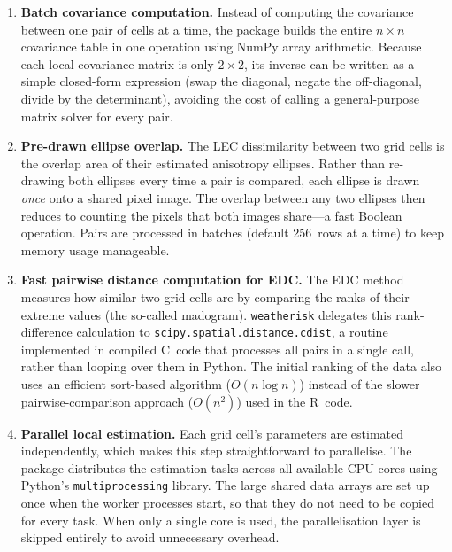 \documentclass[preprint,12pt,a4paper]{elsarticle}
\begin{document}
\begin{enumerate}
\item \textbf{Batch covariance computation.}
  Instead of computing the covariance between one pair of cells at
  a time, the package builds the entire $n \times n$ covariance
  table in one operation using NumPy array arithmetic.  Because each
  local covariance matrix is only $2\times 2$, its inverse can be
  written as a simple closed-form expression (swap the diagonal,
  negate the off-diagonal, divide by the determinant), avoiding the
  cost of calling a general-purpose matrix solver for every pair.

\item \textbf{Pre-drawn ellipse overlap.}
  The LEC dissimilarity between two grid cells is the overlap area
  of their estimated anisotropy ellipses.  Rather than re-drawing
  both ellipses every time a pair is compared, each ellipse is
  drawn \emph{once} onto a shared pixel image.  The overlap between
  any two ellipses then reduces to counting the pixels that both
  images share---a fast Boolean operation.  Pairs are processed in
  batches (default 256~rows at a time) to keep memory usage
  manageable.

\item \textbf{Fast pairwise distance computation for EDC.}
  The EDC method measures how similar two grid cells are by
  comparing the ranks of their extreme values (the so-called
  madogram).  \texttt{weatherisk} delegates this
  rank-difference calculation to \texttt{scipy.spatial.distance.cdist},
  a routine implemented in compiled C~code that processes all
  pairs in a single call, rather than looping over them in
  Python.  The initial ranking of the data also uses an efficient
  sort-based algorithm ($O(n \log n)$) instead of the slower
  pairwise-comparison approach ($O(n^2)$) used in the R~code.

\item \textbf{Parallel local estimation.}
  Each grid cell's parameters are estimated independently, which
  makes this step straightforward to parallelise.  The package
  distributes the estimation tasks across all available CPU cores
  using Python's \texttt{multiprocessing} library.  The large
  shared data arrays are set up once when the worker processes
  start, so that they do not need to be copied for every task.
  When only a single core is used, the parallelisation layer is
  skipped entirely to avoid unnecessary overhead.
\end{enumerate}
\end{document}
